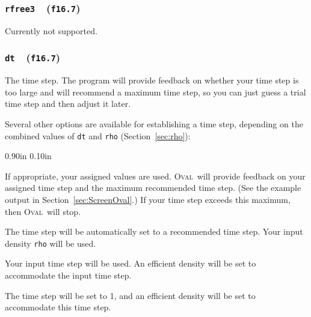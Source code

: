 \documentclass[letterpaper,11pt]{article}
\newcommand{\Oval}{\textsc{Oval}}
\newcommand{\Var}[2]{\texttt{#1}\ \  (\texttt{#2})}
\newlength{\Labelwidth}
\newcommand{\Entrylabel}[1]{\makebox[\Labelwidth][r]{\texttt{#1}}}
\newenvironment{Options}
{\begin{list}{}{%
\renewcommand{\makelabel}{\Entrylabel}%
\setlength{\leftmargin} {0.90in}%
\setlength{\rightmargin}{0.00in}%
\setlength{\labelsep}   {0.10in}%
\setlength{\labelwidth} {\Labelwidth}%
}}
{\end{list}}
\begin{document}
\subsubsection[\texttt{rfree3}]{\Var{rfree3}{f16.7}}\label{sec:rfree3}
Currently not supported.
%
\subsubsection[\texttt{dt}]{\Var{dt}{f16.7}}\label{sec:dt}
The time step.  
The program will provide feedback on whether your time
step is too large and will recommend a maximum time step, so you can
just guess a trial time step and then adjust it later.
\par
Several other options are available for establishing a time step,
depending on the combined values of \texttt{dt} and \texttt{rho}
(Section~\ref{sec:rho}):
\begin{Options}
\item[dt>0, rho>0]
If appropriate, your assigned values are used.  
\Oval\ will provide feedback on your assigned time step and the maximum
recommended time step.
(See the example output in Section~\ref{sec:ScreenOval}.)
If your time step exceeds this maximum, then \Oval\ will stop.
\item[dt=0, rho>0]
The time step will be automatically set to a recommended time step.
Your input density \texttt{rho} will be used.
\item[dt>0, rho=0]
Your input time step will be used.
An efficient density will be set to accommodate the input time step.
\item[dt=0, rho=0]
The time step will be set to 1, and
an efficient density will be set to accommodate this time step.
\end{Options}
\end{document}
